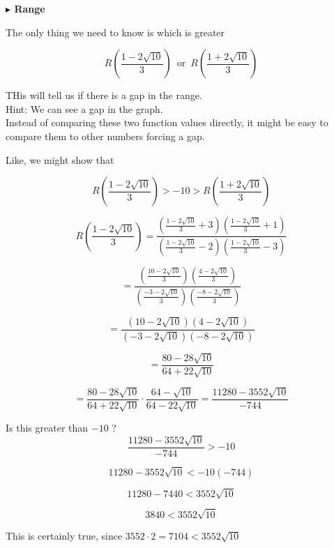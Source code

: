 \documentclass{ximera}
\begin{document}
\begin{example}
\textbf{\textcolor{blue!55!black}{$\blacktriangleright$ Range}} 




The only thing we need to know is which is greater 

\[
R \left( \frac{1 - 2 \sqrt{10}}{3} \right) \, \text{ or } \, R \left( \frac{1 + 2 \sqrt{10}}{3} \right)
\]



THis will tell us if there is a gap in the range. \\
Hint: We can see a gap in the graph. \\

Instead of comparing these two function values directly, it might be easy to compare them to other numbers forcing a gap.


Like, we might show that 


\[
R \left( \frac{1 - 2 \sqrt{10}}{3} \right) > -10 > R \left( \frac{1 + 2 \sqrt{10}}{3} \right)
\]


\[
R\left( \frac{1 - 2 \sqrt{10}}{3}   \right) = \frac{\left( \frac{1 - 2 \sqrt{10}}{3} + 3 \right) \left( \frac{1 - 2 \sqrt{10}}{3} + 1 \right)}{\left( \frac{1 - 2 \sqrt{10}}{3} - 2 \right)  \left( \frac{1 - 2 \sqrt{10}}{3} - 3 \right)}
\]




\[
= \frac{\left( \frac{10 - 2 \sqrt{10}}{3}  \right) \left( \frac{4 - 2 \sqrt{10}}{3} \right)}{\left( \frac{-3 - 2 \sqrt{10}}{3} \right)  \left( \frac{-8 - 2 \sqrt{10}}{3} \right)}
\]




\[
= \frac{ (10 - 2 \sqrt{10}) (4 - 2 \sqrt{10}) }{ (-3 - 2 \sqrt{10}) (-8 - 2 \sqrt{10}) }
\]



\[
= \frac{ 80 - 28 \sqrt{10} }{ 64 + 22\sqrt{10} }
\]




\[
= \frac{ 80 - 28 \sqrt{10} }{ 64 + 22\sqrt{10} } \cdot \frac{ 64 - \sqrt{10} }{ 64 - 22\sqrt{10} } = \frac{11280 - 3552 \sqrt{10}}{-744}
\]



Is this greater than $-10$ ? \\


\[
\frac{11280 - 3552 \sqrt{10}}{-744} > -10
\]

\[
11280 - 3552 \sqrt{10} < -10 (-744)
\]


\[
11280 - 7440 < 3552 \sqrt{10}
\]


\[
3840 < 3552 \sqrt{10}
\]

This is certainly true, since  $3552 \cdot 2 = 7104 < 3552 \sqrt{10}$



\end{example}
\end{document}
